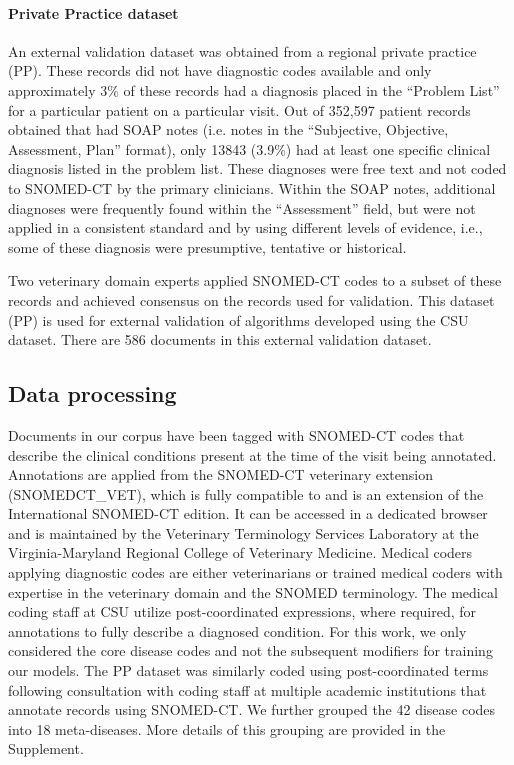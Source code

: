 \documentclass{article}[11pt,oneside]
\begin{document}
\paragraph{Private Practice dataset}
An external validation dataset was obtained from a regional private practice (PP).  These records did not have diagnostic codes available and only approximately 3\% of these records had a diagnosis placed in the ``Problem List'' for a particular patient on a particular visit. Out of 352,597 patient records obtained that had SOAP notes (i.e. notes in the ``Subjective, Objective, Assessment, Plan'' format), only 13843 (3.9\%) had at least one specific clinical diagnosis listed in the problem list.  These diagnoses were free text and not coded to SNOMED-CT by the primary clinicians.  Within the SOAP notes, additional diagnoses were frequently found within the “Assessment” field, but were not applied in a consistent standard and by using different levels of evidence, i.e., some of these diagnosis were presumptive, tentative or historical.

Two veterinary domain experts applied SNOMED-CT codes to a subset of these records and achieved consensus on the records used for validation. This dataset (PP) is used for external validation of algorithms developed using the CSU dataset. There are 586 documents in this external validation dataset.

\subsection*{Data processing}

Documents in our corpus have been tagged with SNOMED-CT codes that describe the clinical conditions present at the time of the visit being annotated.  Annotations are applied from the SNOMED-CT veterinary extension (SNOMEDCT\_VET), which is fully compatible to and is an extension of the International SNOMED-CT edition.  It can be accessed in a dedicated browser and is maintained by the Veterinary Terminology Services Laboratory at the Virginia-Maryland Regional College of Veterinary Medicine.  Medical coders applying diagnostic codes are either veterinarians or trained medical coders with expertise in the veterinary domain and the SNOMED terminology. The medical coding staff at CSU utilize post-coordinated expressions, where required, for annotations to fully describe a diagnosed condition. For this work, we only considered the core disease codes and not the subsequent modifiers for training our models.  The PP dataset was similarly coded using post-coordinated terms following consultation with coding staff at multiple academic institutions that annotate records using SNOMED-CT. We further grouped the 42 disease codes into 18 meta-diseases. More details of this grouping are provided in the Supplement.
\end{document}
